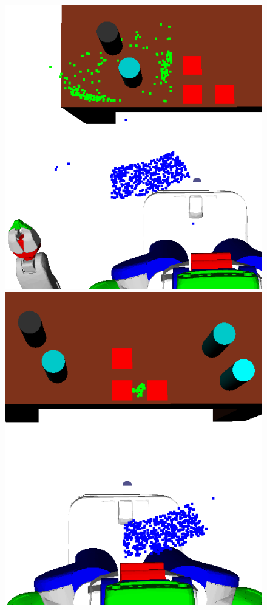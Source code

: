 \begin{figure}[t]
  \centering
    \noindent
    \includegraphics[scale=0.2]{images/move_grasp.png}\hspace{10 mm}
    \includegraphics[scale=0.2]{images/move_putdown.png}

\end{figure}
